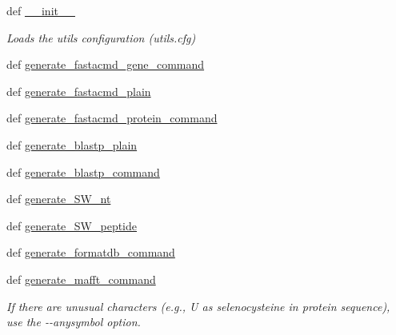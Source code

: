 \begin{DoxyCompactItemize}
\item 
def \hyperlink{classel__utils_1_1almt__cmd__generator_1_1AlignmentCommandGenerator_a7523e31dbd0f86f288a01b44dad27e79}{\-\_\-\-\_\-init\-\_\-\-\_\-}
\begin{DoxyCompactList}\small\item\em Loads the utils configuration (utils.\-cfg) \end{DoxyCompactList}\item 
def \hyperlink{classel__utils_1_1almt__cmd__generator_1_1AlignmentCommandGenerator_a79ca38afce68480d951a4ecc9becec3f}{generate\-\_\-fastacmd\-\_\-gene\-\_\-command}
\item 
def \hyperlink{classel__utils_1_1almt__cmd__generator_1_1AlignmentCommandGenerator_aa2f3f5d5b73c56b0165972309ebb4374}{generate\-\_\-fastacmd\-\_\-plain}
\item 
def \hyperlink{classel__utils_1_1almt__cmd__generator_1_1AlignmentCommandGenerator_ae61c4063e413d4d0668b5999d665cfc4}{generate\-\_\-fastacmd\-\_\-protein\-\_\-command}
\item 
def \hyperlink{classel__utils_1_1almt__cmd__generator_1_1AlignmentCommandGenerator_ada08e757918d9a659105eaccc1ef7f12}{generate\-\_\-blastp\-\_\-plain}
\item 
def \hyperlink{classel__utils_1_1almt__cmd__generator_1_1AlignmentCommandGenerator_a7a7f2869446495e4805f1b31d67ad15b}{generate\-\_\-blastp\-\_\-command}
\item 
def \hyperlink{classel__utils_1_1almt__cmd__generator_1_1AlignmentCommandGenerator_a2c7a6b077847830c9ad2f1f0c15664ac}{generate\-\_\-\-S\-W\-\_\-nt}
\item 
def \hyperlink{classel__utils_1_1almt__cmd__generator_1_1AlignmentCommandGenerator_a3d7d6943ca5bbbf7bd89f47f206a2b1c}{generate\-\_\-\-S\-W\-\_\-peptide}
\item 
def \hyperlink{classel__utils_1_1almt__cmd__generator_1_1AlignmentCommandGenerator_a8add34ae4bc62f5f84ab83919645e5b7}{generate\-\_\-formatdb\-\_\-command}
\item 
def \hyperlink{classel__utils_1_1almt__cmd__generator_1_1AlignmentCommandGenerator_a038c4f2e382869b390b3eaa6209474da}{generate\-\_\-mafft\-\_\-command}
\begin{DoxyCompactList}\small\item\em If there are unusual characters (e.\-g., U as selenocysteine in protein sequence), use the -\/-\/anysymbol option. \end{DoxyCompactList}\end{DoxyCompactItemize}
